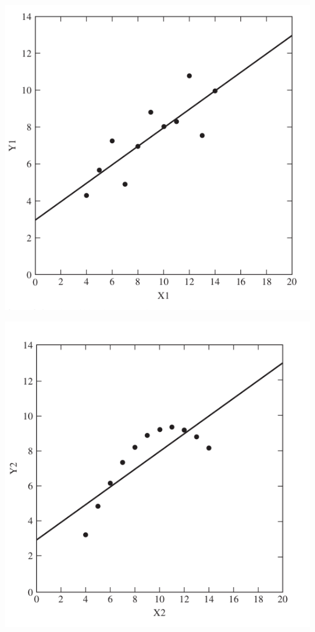 \documentclass{beamer}
\begin{document}
\begin{frame}
  \begin{center}
    \includegraphics[height=0.7\textheight]{eda-dispersao1}
  \end{center}  
\end{frame}

\begin{frame}
  \begin{center}
    \includegraphics[height=0.7\textheight]{eda-dispersao2}
  \end{center}
\end{frame}
\end{document}
